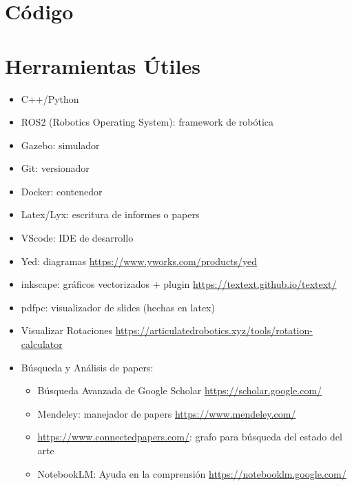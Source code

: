 \documentclass[a4paper,	11pt]{article}
\begin{document}
\section{Código}

\section{Herramientas Útiles}

\begin{itemize}
    \item C++/Python
    \item ROS2 (Robotics Operating System): framework de robótica
    \item Gazebo: simulador
    \item Git: versionador
    \item Docker: contenedor
    \item Latex/Lyx: escritura de informes o papers
    \item VScode: IDE de desarrollo
    \item Yed: diagramas \url{https://www.yworks.com/products/yed}
    \item inkscape: gráficos vectorizados + plugin \url{https://textext.github.io/textext/}
    \item pdfpc: visualizador de slides (hechas en latex)
    \item Visualizar Rotaciones \url{https://articulatedrobotics.xyz/tools/rotation-calculator}
    \item Búsqueda y Análisis de papers:
    \begin{itemize}
        \item Búsqueda Avanzada de Google Scholar \url{https://scholar.google.com/}
        \item Mendeley: manejador de papers \url{https://www.mendeley.com/}
        \item \url{https://www.connectedpapers.com/}: grafo para búsqueda del estado del arte
        \item NotebookLM: Ayuda en la comprensión \url{https://notebooklm.google.com/}
    \end{itemize}
\end{itemize}


\end{document}
